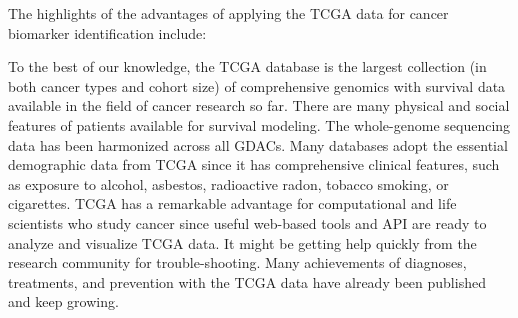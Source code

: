 \documentclass[jpm,article,submit,moreauthors,pdftex]{Definitions/mdpi}
\begin{document}
The highlights of the advantages of applying the TCGA data for cancer biomarker identification include:
\begin{outline}
\1  To the best of our knowledge, the TCGA database is the largest collection (in both cancer types and cohort size) of comprehensive genomics with survival data available in the field of cancer research so far.  
There are many physical and social features of patients available for survival modeling. %
The whole-genome sequencing data has been harmonized across all GDACs.  Many databases adopt the essential demographic data from TCGA since it has comprehensive clinical features, such as exposure to alcohol, asbestos, radioactive radon, tobacco smoking, or cigarettes.
\1  TCGA has a remarkable advantage for computational and life scientists who study cancer since useful web-based tools and API are ready to analyze and visualize TCGA data. It might be getting help quickly from the research community for trouble-shooting.
\1  Many achievements of diagnoses, treatments, and prevention with the TCGA data have already been published and keep growing\cite{Tomczak2015}.\\[0.5cm]
\end{outline}
\end{document}

